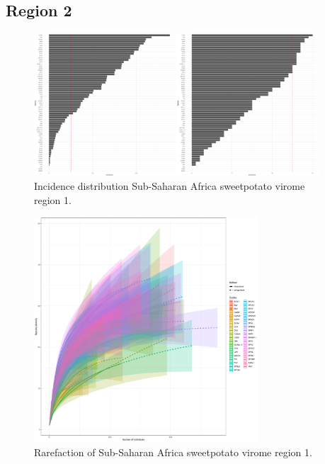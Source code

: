 \documentclass{article}
\begin{document}
\subsection{Region 2}
\begin{figure}[h!]
\begin{center}
\includegraphics[width=0.95\textwidth]{../results/k-cluster2/2-kcluster_incidence_w+bFeb28.pdf
} %
\caption{Incidence distribution Sub-Saharan Africa sweetpotato virome region 1.}
\end{center}
\end{figure}


\begin{figure}[h!]
\begin{center}
\includegraphics[width=0.75\textwidth]{../results/k-cluster2/2-kcluster_rarefaction-iNEXT_Feb28.pdf
} %
\caption{Rarefaction of Sub-Saharan Africa sweetpotato virome region 1.}
\end{center}
\end{figure}
\end{document}
